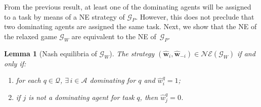 \documentclass{IEEEtran}
\newcommand{\Mcal}[1]{\mathcal{#1}}
\newcommand{\Mc}[1]{\mathcal{#1}}
\newcommand{\bld}[1]{\mathbf{#1}}
\newcommand{\thmtitle}[1]{\mbox{}\emph{(#1).}}
\newtheorem{lemma}[theorem]{Lemma}
\renewcommand{\hat}[1]{\widehat{#1}}
\newcommand{\marginn}[1]{\marginpar{\color{blue}\tiny\ttfamily#1}}
\newcommand{\margin}[1]{\marginpar{\color{magenta}\tiny\ttfamily#1}}
\def \agt{\Mcal{A}}
\def \game{\mathscr{G}}
\def \ne{\Mc{NE}}
\def \nullset{\varnothing}
\def \setfunc{C}
\def \supp{\mathrm{tsupp}\,}
\def \tsk{\Mc{Q}}
\def \w{\bld{w}}
\def \W{\bld{W}}
\def \wb{\overline{\w}}
\def \wh{\hat{\w}}
\begin{document}
From the previous result, at least one of the dominating agents will
be assigned to a task by means of a NE strategy of $\game_P$. However,
this does not preclude that two dominating agents are assigned the
same task. Next, we show that the NE of the relaxed game $\game_W$ are
equivalent to the NE of~$\game_P$.

\begin{lemma}[Nash equilibria of $\game_W$] \label{lem:nash_weight_game}
The strategy $(\wh_i,\wh_{-i}) \in \ne(\game_W)$ if and only if:
\begin{enumerate}
	\item \label{prop:wt_game_dom_agent} for each  $q\in \tsk$, $\exists \, i \in \agt$  dominating for $q$ and $\hat{w}^q_i = 1$;
	\item \label{prop:wt_game_not_dom_agent} if $j$ is not a dominating agent for task $q$, then $\hat{w}^q_j = 0 $.
\end{enumerate}
\end{lemma}
\end{document}
